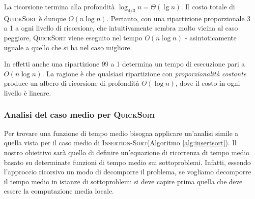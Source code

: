 La ricorsione termina alla profondità $\log_{4/3}n=\Theta(\lg n)$. Il costo totale di \textsc{QuickSort} è dunque $O(n \log n)$. Pertanto, con una ripartizione proporzionale 3 a 1 a ogni livello di ricorsione, che intuitivamente sembra molto vicina al caso peggiore, \textsc{QuickSort} viene eseguito nel tempo $O(n \log n)$ - asintoticamente uguale a quello che si ha nel caso migliore.

In effetti anche una ripartizione 99 a 1 determina un tempo di esecuzione pari a $O(n \log n)$. La ragione è che qualsiasi ripartizione con \textit{proporzionalità costante} produce un albero di ricorsione di profondità $\Theta(\log n)$, dove il costo in ogni livello è lineare.


\begin{center}
	\label{fig:partizionamentobilanciato}
\end{center}

\subsubsection{Analisi del caso medio per \textsc{QuickSort}}
Per trovare una funzione di tempo medio bisogna applicare un'analisi simile a quella vista per il caso medio di \textsc{Insertion-Sort}(Algoritmo \ref{alg:insertsort}). Il nostro obiettivo sarà quello di definire un'equazione di ricorrenza di tempo medio basato su determinate funzioni di tempo medio sui sottoproblemi. Infatti, essendo l'approccio ricorsivo un modo di decomporre il problema, se vogliamo decomporre il tempo medio in istanze di sottoproblemi si deve capire prima quella che deve essere la computazione media locale.

